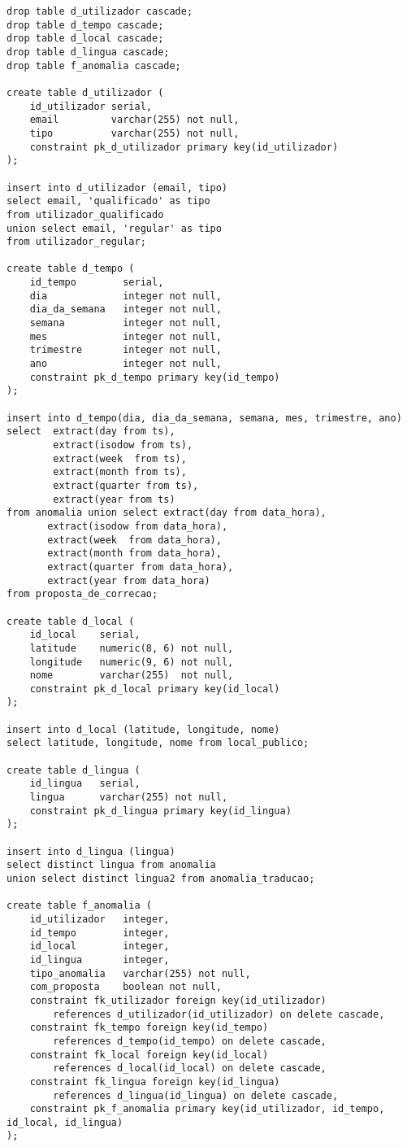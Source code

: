 \documentclass[12pt]{report}
\begin{document}
    \footnotesize \begin{verbatim}
drop table d_utilizador cascade;
drop table d_tempo cascade;
drop table d_local cascade;
drop table d_lingua cascade;
drop table f_anomalia cascade;

create table d_utilizador (
    id_utilizador serial,
    email         varchar(255) not null,
    tipo          varchar(255) not null,
    constraint pk_d_utilizador primary key(id_utilizador)
);

insert into d_utilizador (email, tipo)
select email, 'qualificado' as tipo
from utilizador_qualificado
union select email, 'regular' as tipo
from utilizador_regular;

create table d_tempo (
    id_tempo        serial,
    dia             integer not null,
    dia_da_semana   integer not null,
    semana          integer not null,
    mes             integer not null,
    trimestre       integer not null,
    ano             integer not null,
    constraint pk_d_tempo primary key(id_tempo)
);

insert into d_tempo(dia, dia_da_semana, semana, mes, trimestre, ano)
select  extract(day from ts),
        extract(isodow from ts),
        extract(week  from ts),
        extract(month from ts),
        extract(quarter from ts),
        extract(year from ts)
from anomalia union select extract(day from data_hora),
       extract(isodow from data_hora),
       extract(week  from data_hora),
       extract(month from data_hora),
       extract(quarter from data_hora),
       extract(year from data_hora)
from proposta_de_correcao;

create table d_local (
    id_local    serial,
    latitude    numeric(8, 6) not null,
    longitude   numeric(9, 6) not null,
    nome        varchar(255)  not null,
    constraint pk_d_local primary key(id_local)
);

insert into d_local (latitude, longitude, nome)
select latitude, longitude, nome from local_publico;

create table d_lingua (
    id_lingua   serial,
    lingua      varchar(255) not null,
    constraint pk_d_lingua primary key(id_lingua)
);

insert into d_lingua (lingua)
select distinct lingua from anomalia
union select distinct lingua2 from anomalia_traducao;

create table f_anomalia (
    id_utilizador   integer,
    id_tempo        integer,
    id_local        integer,
    id_lingua       integer,
    tipo_anomalia   varchar(255) not null,
    com_proposta    boolean not null,
    constraint fk_utilizador foreign key(id_utilizador)
        references d_utilizador(id_utilizador) on delete cascade,
    constraint fk_tempo foreign key(id_tempo)
        references d_tempo(id_tempo) on delete cascade,
    constraint fk_local foreign key(id_local)
        references d_local(id_local) on delete cascade,
    constraint fk_lingua foreign key(id_lingua)
        references d_lingua(id_lingua) on delete cascade,
    constraint pk_f_anomalia primary key(id_utilizador, id_tempo, id_local, id_lingua)
);


\end{verbatim}
\end{document}
